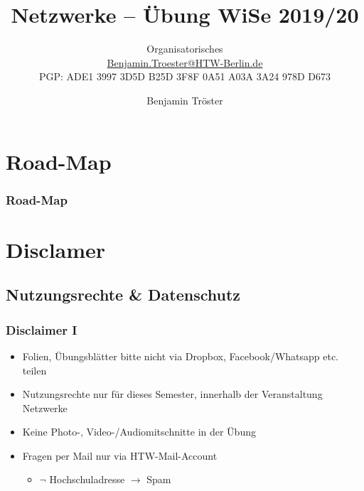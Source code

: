 \documentclass[xcolor=dvipsnames,aspectratio=169]{beamer}
\begin{document}

\title{Netzwerke -- Übung WiSe 2019/20}
\subtitle{Organisatorisches\\

\href{mailto:Benjamin.Troester@HTW-Berlin.de}{Benjamin.Troester@HTW-Berlin.de}\\
		PGP: ADE1 3997 3D5D B25D 3F8F 0A51 A03A 3A24 978D D673 }

\author{Benjamin Tröster}

\date{}

\begin{frame}
\titlepage
\end{frame}

\section*{Road-Map}
\begin{frame}
\frametitle{Road-Map}
\begin{multicols}{2}
  \tableofcontents
\end{multicols}
\end{frame}

\section{Disclamer}

\subsection{Nutzungsrechte \& Datenschutz}
\begin{frame}
	\frametitle{Disclaimer I}
	\begin{itemize}
		\item Folien, Übungsblätter bitte nicht via Dropbox, Facebook/Whatsapp etc. teilen
		\item Nutzungsrechte nur für dieses Semester, innerhalb der Veranstaltung Netzwerke
		\item Keine Photo-, Video-/Audiomitschnitte in der Übung
		\item Fragen per Mail nur via HTW-Mail-Account
		\begin{itemize}
			\item $\neg$ Hochschuladresse $\rightarrow$ Spam
		\end{itemize}		 
	\end{itemize}
\end{frame}
\end{document}

